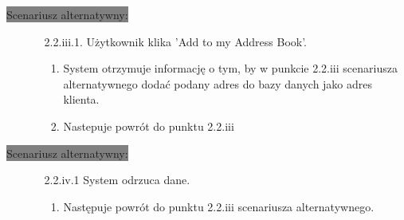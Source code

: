 \documentclass[12pt]{report}
\begin{document}
			\colorbox{grey}{Scenariusz alternatywny:}
			\begin{enumerate}\addtocounter{enumi}{2}
				\item[]
				\begin{enumerate}
					\item[2.2.iii.1.] Użytkownik klika 'Add to my Address Book'.
					\begin{enumerate}
						\item System otrzymuje informację o tym, by w punkcie 2.2.iii scenariusza alternatywnego dodać podany adres do bazy danych jako adres klienta.
						\item Nastepuje powrót do punktu 2.2.iii
					\end{enumerate}
				\end{enumerate}
			\end{enumerate}
	
			\colorbox{grey}{Scenariusz alternatywny:}
			\begin{enumerate}\addtocounter{enumi}{2}
				\item[]
				\begin{enumerate}
					\item[2.2.iv.1] System odrzuca dane.
					\begin{enumerate}
						\item Następuje powrót do punktu 2.2.iii scenariusza alternatywnego.
					\end{enumerate}
				\end{enumerate}
			\end{enumerate}
			\newpage
			
\end{document}
